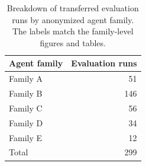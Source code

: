 \begin{table}[t]
  \centering
  \small
  \begin{tabular}{lr}
    \toprule
    Agent family & Evaluation runs \\
    \midrule
    Family A & 51 \\
    Family B & 146 \\
    Family C & 56 \\
    Family D & 34 \\
    Family E & 12 \\
    \midrule
    Total & 299 \\
    \bottomrule
  \end{tabular}
  \caption{Breakdown of transferred evaluation runs by anonymized agent family. The labels match the family-level figures and tables.}
  \label{tab:cross-agent-run-counts}
\end{table}
